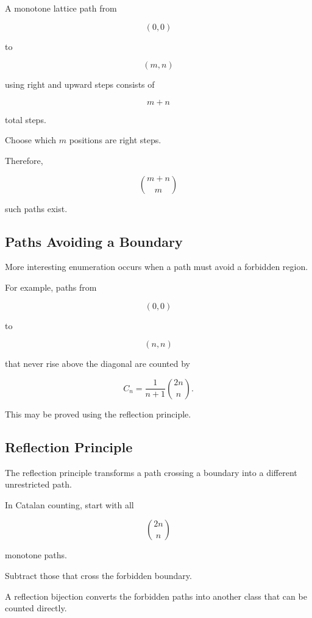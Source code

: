 A monotone lattice path from

\[
(0,0)
\]

to

\[
(m,n)
\]

using right and upward steps consists of

\[
m+n
\]

total steps.

Choose which \(m\) positions are right steps.

Therefore,

\[
\boxed{
\binom{m+n}{m}
}
\]

such paths exist.

\subsection{Paths Avoiding a Boundary}
\label{subsec:lattice-path-boundaries}

More interesting enumeration occurs when a path must avoid a forbidden
region.

For example, paths from

\[
(0,0)
\]

to

\[
(n,n)
\]

that never rise above the diagonal are counted by

\[
\boxed{
C_n
=
\frac{1}{n+1}\binom{2n}{n}.
}
\]

This may be proved using the reflection principle.

\subsection{Reflection Principle}
\label{subsec:reflection-principle}

The reflection principle transforms a path crossing a boundary into a
different unrestricted path.

In Catalan counting, start with all

\[
\binom{2n}{n}
\]

monotone paths.

Subtract those that cross the forbidden boundary.

A reflection bijection converts the forbidden paths into another class
that can be counted directly.

